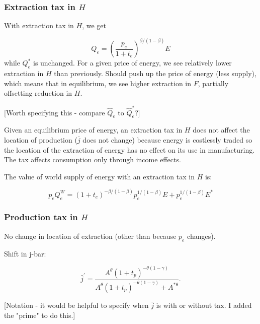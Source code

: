 \documentclass[notitlepage,12pt]{article}
\begin{document}
\subsubsection{Extraction tax in $H$}

With extraction tax in $H$, we get

\begin{equation*}
Q_{e}=\left( \frac{p_{e}}{1+t_{e}}\right) ^{\beta /\left( 1-\beta \right) }E
\end{equation*}%
while $Q_{e}^{\ast }$ is unchanged. For a given price of energy, we see
relatively lower extraction in $H$ than previously. Should push up the price
of energy (less supply), which means that in equilibrium, we see higher
extraction in $F$, partially offsetting reduction in $H$.

[Worth specifying this - compare $\hat{Q}_{e}$ to $\hat{Q}_{e}^{\ast }$?]

Given an equilibrium price of energy, an extraction tax in $H$ does not
affect the location of production ($\bar{j}$ does not change) because energy
is costlessly traded so the location of the extraction of energy has no
effect on its use in manufacturing. The tax affects consumption only through
income effects.

The value of world supply of energy with an extraction tax in $H$ is:

\begin{equation}
p_{e}Q_{e}^{W}=\left( 1+t_{e}\right) ^{-\beta /\left( 1-\beta \right)
}p_{e}^{1/\left( 1-\beta \right) }E+p_{e}^{1/\left( 1-\beta \right) }E^{\ast
}  \label{Supply of energy with extraction tax in H}
\end{equation}

\subsubsection{Production tax in $H$}

No change in location of extraction (other than because $p_{e}$ changes).

Shift in j-bar:

\begin{equation*}
\bar{j}^{\prime }=\frac{A^{\theta }\left( 1+t_{p}\right) ^{-\theta \left(
1-\gamma \right) }}{A^{\theta }\left( 1+t_{p}\right) ^{-\theta \left(
1-\gamma \right) }+A^{\ast \theta }}.
\end{equation*}

[Notation - it would be helpful to specify when $\bar{j}$ is with or without
tax. I added the "prime" to do this.]
\end{document}
